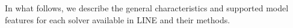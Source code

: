 
In what follows, we describe the general characteristics and supported model features for each solver available in \textsc{LINE} and their methods.

